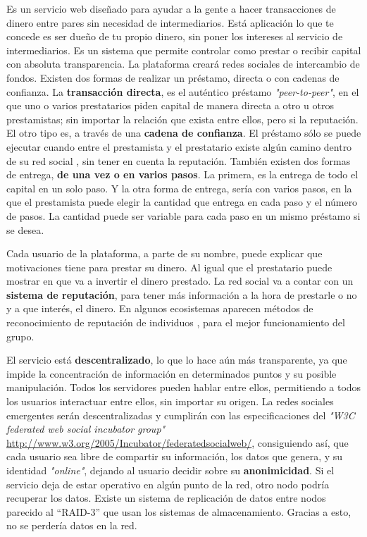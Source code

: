 \documentclass[a4paper, 12pt]{book}
\begin{document}
Es un servicio web diseñado para ayudar a la gente a hacer transacciones de 
dinero entre pares sin necesidad de intermediarios. Está aplicación lo que te 
concede es ser dueño de tu propio dinero, sin poner los intereses al servicio 
de intermediarios. Es un sistema que permite controlar como prestar o recibir 
capital con absoluta transparencia. La plataforma creará redes sociales de 
intercambio de fondos. Existen dos formas de realizar un préstamo, directa o 
con cadenas de confianza. La \textbf{transacción directa}, es el auténtico 
préstamo \textit{"peer-to-peer"}, en el que uno o varios prestatarios piden 
capital de manera directa a otro u otros prestamistas; sin importar la relación 
que exista entre ellos, pero si la reputación. El otro tipo es, a través de una 
\textbf{cadena de confianza}. El préstamo sólo se puede ejecutar cuando entre 
el prestamista y el prestatario existe algún camino dentro de su red social 
\cite{ripple}, sin tener en cuenta la reputación. También existen dos formas 
de entrega, \textbf{de una vez o en varios pasos}. La primera, es la entrega 
de todo el capital en un solo paso. Y la otra forma de entrega, sería con 
varios pasos, en la que el prestamista puede elegir la cantidad que entrega en 
cada paso y el número de pasos. La cantidad puede ser variable para cada paso 
en un mismo préstamo si se desea.

Cada usuario de la plataforma, a parte de su nombre, puede explicar que 
motivaciones tiene para prestar su dinero. Al igual que el prestatario puede 
mostrar en que va a invertir el dinero prestado. La red social va a contar 
con un \textbf{sistema de reputación}, para tener más información a la hora de 
prestarle o no y a que interés, el dinero. En algunos ecosistemas aparecen 
métodos de reconocimiento de reputación de individuos \cite{Martin Novack}, 
para el mejor funcionamiento del grupo.

El servicio está \textbf{descentralizado}, lo que lo hace aún más transparente, 
ya que impide la concentración de información en determinados puntos y su 
posible manipulación. Todos los servidores pueden hablar entre ellos, 
permitiendo a todos los usuarios interactuar entre ellos, sin importar su 
origen. La redes sociales emergentes serán descentralizadas y cumplirán con las 
especificaciones del \textit{"W3C federated web social incubator group"} 
\url{http://www.w3.org/2005/Incubator/federatedsocialweb/}, consiguiendo así, 
que cada usuario sea libre de compartir su información, los datos que genera, 
y su identidad \textit{"online"}, dejando al usuario decidir sobre su 
\textbf{anonimicidad}. Si el servicio deja de estar operativo en algún punto de 
la red, otro nodo podría recuperar los datos. Existe un sistema de replicación 
de datos entre nodos parecido al ``RAID-3'' que usan los sistemas de 
almacenamiento. Gracias a esto, no se perdería datos en la red. 
\end{document}
